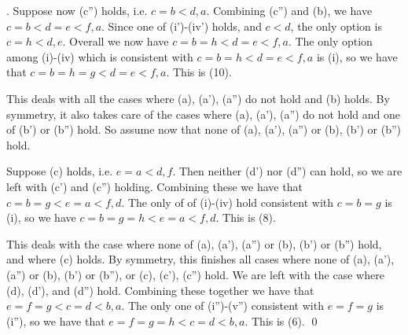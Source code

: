 \documentclass[12pt,oneside,british,a4wide]{amsart}
\numberwithin{equation}{section}
\theoremstyle{definition}
\newenvironment{proofof}[1]{\indent{\itshape Proof of #1}.\;}{\qed}
\begin{document}
\begin{proofof}{Lemma \ref{lem:2hop}}
Suppose now (c'') holds, i.e. $c=b<d,a$.  Combining (c'') and (b), we have $c=b<d=e<f,a$.  Since one of (i')-(iv') holds, and $c<d$, the only option is $c=h<d,e$.  Overall we now have $c=b=h<d=e<f,a$.   The only option among (i)-(iv) which is consistent with  $c=b=h<d=e<f,a$ is (i), so we have that $c=b=h=g<d=e<f,a$. This is (10).

This deals with all the cases where (a), (a'), (a'') do not hold and (b) holds.  By symmetry, it also takes care of the cases where   (a), (a'), (a'') do not hold and one of (b') or (b'') hold.  So assume now that none of (a), (a'), (a'') or (b), (b') or (b'') hold.

Suppose (c) holds, i.e. $e=a<d,f$.  Then neither (d') nor (d'') can hold, so we are left with (c') and (c'') holding.  Combining these we have that $c=b=g<e=a<f,d$.  The only of of (i)-(iv) hold consistent with   $c=b=g$ is (i), so we have $c=b=g=h<e=a<f,d$.  This is (8).

This deals with the case where none of (a), (a'), (a'') or (b), (b') or (b'') hold, and where (c) holds.  By symmetry, this finishes all cases where none of (a), (a'), (a'') or (b), (b') or (b''), or (c), (c'), (c'') hold.  We are left with the case where (d), (d'), and (d'') hold.  Combining these together we have that $e=f=g<c=d<b,a$.  The only one of (i'')-(v'') consistent with $e=f=g$ is (i''), so we have that $e=f=g=h<c=d<b,a$.   This is (6).			
\end{proofof}

\vspace{2mm}
\end{document}
